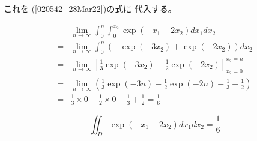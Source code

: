 \documentclass[12pt,b5paper]{ltjsarticle}
\begin{document}
これを
(\ref{020542_28Mar22})の式に
代入する。

\begin{align}
 & \lim_{n \rightarrow \infty}\int_0^{n} \int_0^{x_2} \exp(-x_1 -2x_2) d{x_1} d{x_2}\\
 =& \lim_{n \rightarrow \infty}\int_0^{n} (-\exp( -3x_2) +\exp( -2x_2))  d{x_2}\\
 =& \lim_{n \rightarrow \infty} \left[ \frac{1}{3} \exp( -3x_2) -\frac{1}{2}\exp( -2x_2) \right]_{x_2=0}^{x_2=n}\\
 =& \lim_{n \rightarrow \infty} \left( \frac{1}{3} \exp( -3n) -\frac{1}{2}\exp( -2n) - \frac{1}{3} +\frac{1}{2}\right)\\
 =&  \frac{1}{3}\times 0 -\frac{1}{2}\times 0 - \frac{1}{3} +\frac{1}{2}
 = \frac{1}{6}
\end{align}

\begin{equation}
  \iint_{D} \exp(-x_1 -2x_2) d{x_1} d{x_2}
   = \frac{1}{6}
\end{equation}
\end{document}
